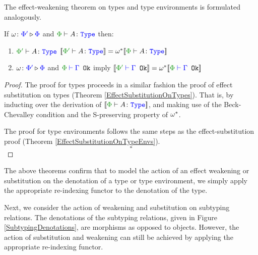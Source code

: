\documentclass{Report}
\begin{document}
The effect-weakening theorem on types and type environments is formulated analogously.

\begin{framed}
    \begin{theorem}\label{EffectWeakeningOnTypes}  
        If $\omega \colon {\color{blue}\Phi'} \triangleright {\color {blue} \Phi}$ and $\wellformedtype{\P}{A}$ then:
        \begin{enumerate}[label=\roman*.]
            \item $\wellformedtype{\P'}{A}$ $\deno{\wellformedtype{\P'}{A}} = \w\star\deno{\wellformedtype{\P}{A}}$
            \item $\omega \colon {\color{blue}\Phi'} \triangleright {\color {blue} \Phi}$ and $\wellformedok{\P}{\G}$ imply $\deno{\wellformedok{\P'}{\G}} = \w\star\deno{\wellformedok{\P}{\G}}$
        \end{enumerate}        
    \end{theorem}
    

\begin{proof}
    The proof for types proceeds in a similar fashion the proof of effect substitution on types (Theorem \ref{EffectSubstitutionOnTypes}). That is, by inducting over the derivation of $\deno{\typerelation{\P}{A}{\type}}$, and making use of the Beck-Chevalley condition and the S-preserving property of $\omega^*$.
   
    The proof for type environments follows the same steps as the effect-substitution proof (Theorem \ref{EffectSubstitutionOnTypeEnvs}).
    $$\square$$
\end{proof}
\end{framed}

The above theorems confirm that to model the action of  an effect weakening or substitution on the denotation of a type or type environment, we simply apply the appropriate re-indexing functor to the denotation of the type.

Next, we consider the action of weakening and substitution on subtyping relations. The denotations of the subtyping relations, given in Figure \ref{SubtypingDenotations}, are morphisms as opposed to objects. However, the action of substitution and weakening can still be achieved by applying the appropriate re-indexing functor.
\end{document}
